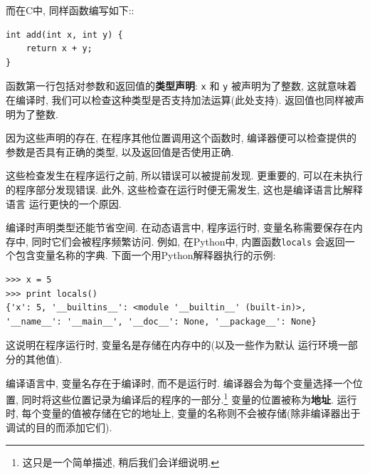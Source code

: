\documentclass[12pt]{book}
\begin{document}
{而在C中, 同样函数编写如下::

\begin{verbatim}
int add(int x, int y) {
    return x + y;
}
\end{verbatim}

函数第一行包括对参数和返回值的{\bf 类型声明}:
{\tt x} 和 {\tt y} 被声明为了整数, 
这就意味着在编译时, 我们可以检查这种类型是否支持加法运算(此处支持).
返回值也同样被声明为了整数.

因为这些声明的存在, 在程序其他位置调用这个函数时, 
编译器便可以检查提供的参数是否具有正确的类型, 
以及返回值是否使用正确.

这些检查发生在程序运行之前, 
所以错误可以被提前发现.
更重要的, 可以在未执行的程序部分发现错误.
此外, 这些检查在运行时便无需发生, 这也是编译语言比解释语言
运行更快的一个原因.

编译时声明类型还能节省空间.
在动态语言中, 程序运行时, 变量名称需要保存在内存中,
同时它们会被程序频繁访问.
例如, 在Python中, 内置函数{\tt locals} 会返回一个包含变量名称的字典.
下面一个用Python解释器执行的示例:

\begin{verbatim}
>>> x = 5
>>> print locals()
{'x': 5, '__builtins__': <module '__builtin__' (built-in)>,
'__name__': '__main__', '__doc__': None, '__package__': None}
\end{verbatim}

这说明在程序运行时, 变量名是存储在内存中的(以及一些作为默认
运行环境一部分的其他值).

编译语言中, 变量名存在于编译时, 而不是运行时.
编译器会为每个变量选择一个位置,
同时将这些位置记录为编译后的程序的一部分.\footnote{
这只是一个简单描述, 稍后我们会详细说明.}  
变量的位置被称为{\bf 地址}.
运行时, 每个变量的值被存储在它的地址上,
变量的名称则不会被存储(除非编译器出于调试的目的而添加它们).





}
\end{document}
